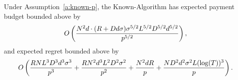 \begin{theorem}
\label{rst:known-p}
Under Assumption~\ref{a:known-p}, the Known-\MinProb Algorithm has expected payment budget bounded above by 
\begin{align*}
O \left(\frac{N^2 d \cdot (R + D d \sigma)\sigma^{5/2}L^{5/2}D^{5/2}d^{5/2}}{p^{5/2}} \right),
\end{align*}
and expected regret bounded above by
\begin{align*}
O \left(\frac{R N L^3 D^3 d^3 \sigma^3}{p^3}
  + \frac{R N^2 d^3 L^2 D^2 \sigma^2}{p^2}
  + \frac{N^2 dR}{p}
  + \frac{ND^2 d^2\sigma^2 L(\log(T))^3}{p}\right).
\end{align*}
\end{theorem}

